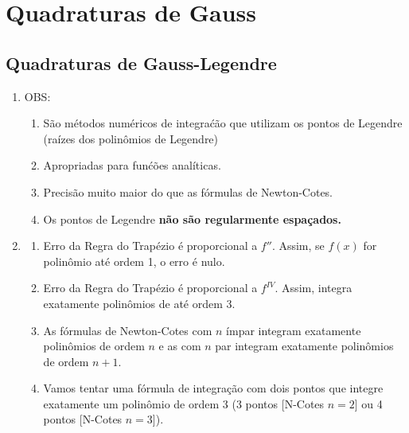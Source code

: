 \section{Quadraturas de Gauss}

\subsection{Quadraturas de Gauss-Legendre}

\begin{enumerate}

\item 
OBS:

\begin{enumerate}

\item 
S\~ao m\'etodos num\'ericos de integra\'c\~ao que utilizam os pontos de Legendre (ra\'izes dos polin\^omios de Legendre)

\item
Apropriadas para fun\'c\~oes anal\'iticas.

\item
Precis\~ao muito maior do que as f\'ormulas de Newton-Cotes.

\item
Os pontos de Legendre \textbf{não são regularmente espaçados.}

\end{enumerate}

\item

\begin{enumerate}

 \item 
Erro da Regra do Trap\'ezio \'e proporcional a $f''$. Assim, se $f(x)$ for polin\^omio at\'e ordem 1, o erro \'e nulo.

\item
Erro da Regra do Trapézio é proporcional a $f^{IV}$. Assim, integra exatamente polinômios de até ordem 3.

\item
As fórmulas de Newton-Cotes com $n$ ímpar integram exatamente polinômios de ordem $n$ e as com $n$ par integram exatamente polinômios de ordem $n+1$.

\item
Vamos tentar uma fórmula de integração com dois pontos que integre exatamente um polinômio de ordem 3 (3 pontos [N-Cotes $n=2$] ou 4 pontos [N-Cotes $n=3$]).

\end{enumerate}


\end{enumerate}
